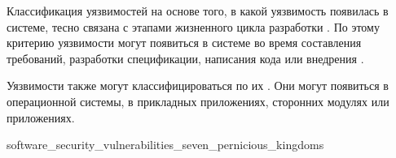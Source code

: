 %
Классификация уязвимостей на основе того, в какой  уязвимость появилась в системе, тесно связана с этапами жизненного цикла разработки . 
%
По этому критерию уязвимости могут появиться в системе во время составления требований, разработки спецификации, написания кода или внедрения  . 

%
Уязвимости также могут классифицироваться по их  . 
%
Они могут появиться в  операционной системы, в прикладных приложениях, сторонних модулях или приложениях. 


	{software_security_vulnerabilities_seven_pernicious_kingdoms}

